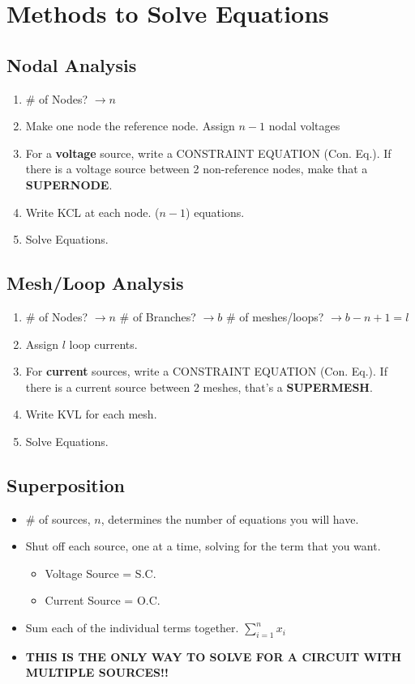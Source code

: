 \documentclass[10pt,letterpaper,final,twoside,notitlepage]{article}
\begin{document}
\section*{Methods to Solve Equations} \label{sec:Solve Circuits}
	\subsection*{Nodal Analysis} \label{subsec:Nodal Analysis}
		\begin{enumerate}
			\item \# of Nodes? $\rightarrow n$
			\item Make one node the reference node. Assign $n-1$ nodal voltages
			\item For a \textbf{voltage} source, write a CONSTRAINT EQUATION (Con. Eq.). If there is a voltage source between 2 non-reference nodes, make that a \textbf{SUPERNODE}.
			\item Write KCL at each node. ($n-1$) equations.
			\item Solve Equations.
		\end{enumerate}
	\subsection*{Mesh/Loop Analysis} \label{subsec:Mesh Analysis}
		\begin{enumerate}
			\item \# of Nodes? $\rightarrow n$ \# of Branches? $\rightarrow b$ \# of meshes/loops? $\rightarrow b-n+1 = l$
			\item Assign $l$ loop currents.
			\item For \textbf{current} sources, write a CONSTRAINT EQUATION (Con. Eq.). If there is a current source between 2 meshes, that's a \textbf{SUPERMESH}.
			\item Write KVL for each mesh.
			\item Solve Equations.
		\end{enumerate}
	\subsection*{Superposition} \label{subsec:Superposition}
		\begin{itemize}[noitemsep, nolistsep]
			\item \# of sources, $n$, determines the number of equations you will have.
			\item Shut off each source, one at a time, solving for the term that you want.
			\begin{itemize}[noitemsep, nolistsep]
				\item Voltage Source = S.C.
				\item Current Source = O.C.
			\end{itemize}
			\item Sum each of the individual terms together. $\sum_{i=1}^{n} x_{i}$ \vspace{1.5mm}
			\item \textbf{\large THIS IS THE ONLY WAY TO SOLVE FOR A CIRCUIT WITH MULTIPLE SOURCES!!}
		\end{itemize}
\end{document}
